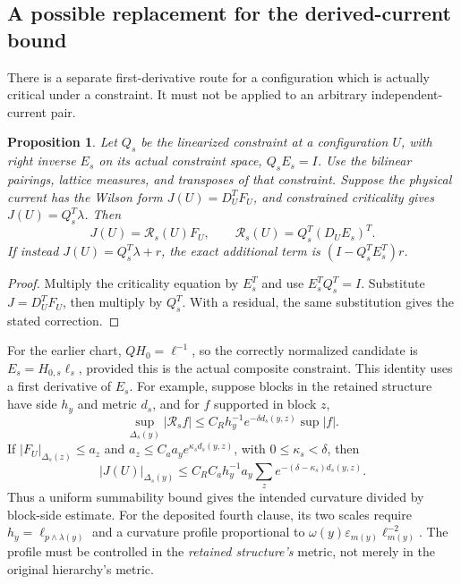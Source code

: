\documentclass[11pt]{article}
\newtheorem{proposition}[theorem]{Proposition}
\theoremstyle{remark}
\begin{document}
\subsection{A possible replacement for the derived-current bound}

There is a separate first-derivative route for a configuration which
is actually critical under a constraint. It must not be applied to
an arbitrary independent-current pair.

\begin{proposition}\label{prop:derived-current}
Let $Q_s$ be the linearized constraint at a configuration $U$, with
right inverse $E_s$ on its actual constraint space, $Q_sE_s=I$.
Use the bilinear pairings, lattice measures, and transposes of that
constraint. Suppose the physical current has the Wilson form
$J(U)=D_U^TF_U$, and constrained criticality gives
$J(U)=Q_s^T\lambda$. Then
\begin{equation}\label{eq:derived-current}
 J(U)=\mathcal R_s(U)F_U,\qquad
 \mathcal R_s(U)=Q_s^T(D_UE_s)^T.
\end{equation}
If instead $J(U)=Q_s^T\lambda+r$, the exact additional term is
$(I-Q_s^TE_s^T)r$.
\end{proposition}

\begin{proof}
Multiply the criticality equation by $E_s^T$ and use
$E_s^TQ_s^T=I$. Substitute $J=D_U^TF_U$, then multiply by $Q_s^T$.
With a residual, the same substitution gives the stated correction.
\end{proof}

For the earlier chart, $QH_0=\ell^{-1}$, so the correctly normalized
candidate is $E_s=H_{0,s}\ell_s$, provided this is the actual composite
constraint. This identity uses a first derivative of $E_s$.
For example, suppose blocks in the retained structure have side $h_y$
and metric $d_s$, and for $f$ supported in block $z$,
\[
 \sup_{\Delta_s(y)}|\mathcal R_sf|
 \le C_R h_y^{-1}e^{-\delta d_s(y,z)}\sup|f|.
\]
If $|F_U|_{\Delta_s(z)}\le a_z$ and
$a_z\le C_a a_y e^{\kappa_s d_s(y,z)}$, with
$0\le\kappa_s<\delta$, then
\[
 |J(U)|_{\Delta_s(y)}
 \le C_RC_a h_y^{-1}a_y
       \sum_z e^{-(\delta-\kappa_s)d_s(y,z)}.
\]
Thus a uniform summability bound gives the intended curvature divided
by block-side estimate. For the deposited fourth clause, its two
scales require $h_y=\ell_{p\wedge\lambda(y)}$ and a curvature
profile proportional to
$\omega(y)\varepsilon_{m(y)}\ell_{m(y)}^{-2}$.
The profile must be controlled in the \emph{retained structure's}
metric, not merely in the original hierarchy's metric.
\end{document}

